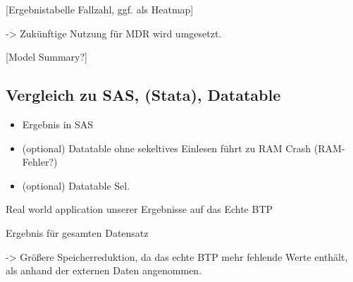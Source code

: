 \documentclass[
  german,
  10pt,
  twoside]{article}
\providecommand{\tightlist}{%
  \setlength{\itemsep}{0pt}\setlength{\parskip}{0pt}}
\begin{document}
{[}Ergebnistabelle Fallzahl, ggf. als Heatmap{]}

-\textgreater{} Zukünftige Nutzung für MDR wird umgesetzt.

{[}Model Summary?{]}

\subsection{Vergleich zu SAS, (Stata),
Datatable}\label{vergleich-zu-sas-stata-datatable}

\begin{itemize}
\tightlist
\item
  Ergebnis in SAS
\item
  (optional) Datatable ohne sekeltives Einlesen führt zu RAM Crash
  (RAM-Fehler?)
\item
  (optional) Datatable Sel.
\end{itemize}

Real world application unserer Ergebnisse auf das Echte BTP

Ergebnis für gesamten Datensatz

-\textgreater{} Größere Speicherreduktion, da das echte BTP mehr
fehlende Werte enthält, als anhand der externen Daten angenommen.


\printbibliography
\end{document}
